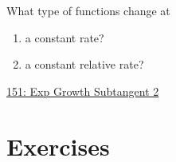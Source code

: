 \documentclass{ximera}
\begin{document}
\begin{question}  \label{Qlgkfglbnbn}
What type of functions change at 
\begin{enumerate}
\item a constant rate?

\item a constant relative rate?
\end{enumerate}
\end{question}


\begin{exploration} \label{EdfERERE}

\href{https://www.desmos.com/calculator/zlfka62ec0}{151: Exp Growth Subtangent 2}

 
\begin{onlineOnly}
    \begin{center}
\end{center}
\end{onlineOnly}


\end{exploration}

\section{Exercises}
\end{document}
